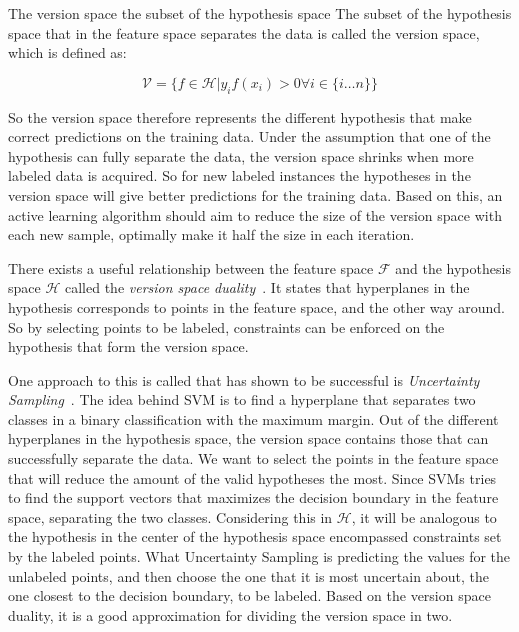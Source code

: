 The version space the subset of the hypothesis space
The subset of the hypothesis space that in the feature space separates the data is called the version space, which is defined as:

\begin{equation}\label{eq:version-space}
    \mathcal{V} = \Bigg \{ f \in \mathcal{H} | y_i f(x_i) > 0 \forall i \in \{i \dots n\} \Bigg \}
\end{equation}

So the version space therefore represents the different hypothesis that make correct predictions on the training data.
Under the assumption that one of the hypothesis can fully separate the data, the version space shrinks when more labeled data is acquired.
So for new labeled instances the hypotheses in the version space will give better predictions for the training data.
Based on this, an active learning algorithm should aim to reduce the size of the version space with each new sample, optimally make it half the size in each iteration.

There exists a useful relationship between the feature space $\mathcal{F}$ and the hypothesis space $\mathcal{H}$ called the \textit{version space duality}~\cite{tong2001support, vapnik1998statistical}.
It states that hyperplanes in the hypothesis corresponds to points in the feature space, and the other way around.
So by selecting points to be labeled, constraints can be enforced on the hypothesis that form the version space.

One approach to this is called that has shown to be successful is \textit{Uncertainty Sampling}~\cite{settles2012active}.
The idea behind SVM is to find a hyperplane that separates two classes in a binary classification with the maximum margin.
Out of the different hyperplanes in the hypothesis space, the version space contains those that can successfully separate the data.
We want to select the points in the feature space that will reduce the amount of the valid hypotheses the most.
Since SVMs tries to find the support vectors that maximizes the decision boundary in the feature space, separating the two classes.
Considering this in $\mathcal{H}$, it will be analogous to the hypothesis in the center of the hypothesis space encompassed constraints set by the labeled points.
What Uncertainty Sampling is predicting the values for the unlabeled points, and then choose the one that it is most uncertain about, the one closest to the decision boundary, to be labeled.
Based on the version space duality, it is a good approximation for dividing the version space in two.

